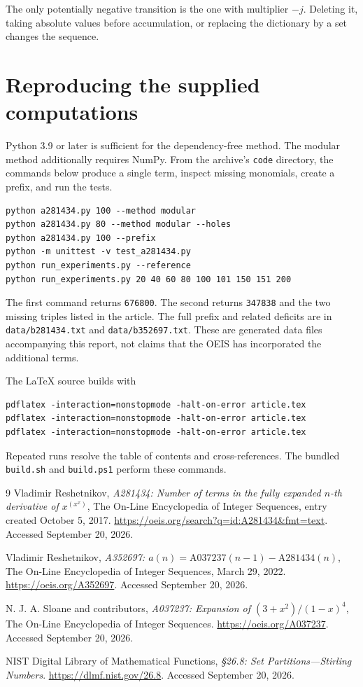 \documentclass[11pt]{article}
\numberwithin{equation}{section}
\theoremstyle{definition}
\theoremstyle{remark}
\begin{document}
The only potentially negative transition is the one with multiplier $-j$.
Deleting it, taking absolute values before accumulation, or replacing the
dictionary by a set changes the sequence.

\clearpage
\section{Reproducing the supplied computations}

Python 3.9 or later is sufficient for the dependency-free method. The modular
method additionally requires NumPy. From the archive's \texttt{code}
directory, the commands below produce a single term, inspect missing
monomials, create a prefix, and run the tests.
\begin{lstlisting}[language={}]
python a281434.py 100 --method modular
python a281434.py 80 --method modular --holes
python a281434.py 100 --prefix
python -m unittest -v test_a281434.py
python run_experiments.py --reference
python run_experiments.py 20 40 60 80 100 101 150 151 200
\end{lstlisting}
The first command returns \texttt{676800}. The second returns
\texttt{347838} and the two missing triples listed in the article.
The full prefix and related deficits are in \texttt{data/b281434.txt} and
\texttt{data/b352697.txt}. These are generated data files accompanying this
report, not claims that the OEIS has incorporated the additional terms.

The LaTeX source builds with
\begin{lstlisting}[language={}]
pdflatex -interaction=nonstopmode -halt-on-error article.tex
pdflatex -interaction=nonstopmode -halt-on-error article.tex
pdflatex -interaction=nonstopmode -halt-on-error article.tex
\end{lstlisting}
Repeated runs resolve the table of contents and cross-references. The bundled
\texttt{build.sh} and \texttt{build.ps1} perform these commands.

\begin{thebibliography}{9}
Vladimir Reshetnikov,
\emph{A281434: Number of terms in the fully expanded $n$-th derivative of
$x^{(x^x)}$}, The On-Line Encyclopedia of Integer Sequences, entry created
October 5, 2017.
\url{https://oeis.org/search?q=id:A281434&fmt=text}.
Accessed September 20, 2026.

Vladimir Reshetnikov,
\emph{A352697: $a(n)=\mathrm{A037237}(n-1)-\mathrm{A281434}(n)$},
The On-Line Encyclopedia of Integer Sequences, March 29, 2022.
\url{https://oeis.org/A352697}.
Accessed September 20, 2026.

N. J. A. Sloane and contributors,
\emph{A037237: Expansion of $(3+x^2)/(1-x)^4$},
The On-Line Encyclopedia of Integer Sequences.
\url{https://oeis.org/A037237}.
Accessed September 20, 2026.

NIST Digital Library of Mathematical Functions,
\emph{\S26.8: Set Partitions---Stirling Numbers}.
\url{https://dlmf.nist.gov/26.8}.
Accessed September 20, 2026.
\end{thebibliography}
\end{document}
